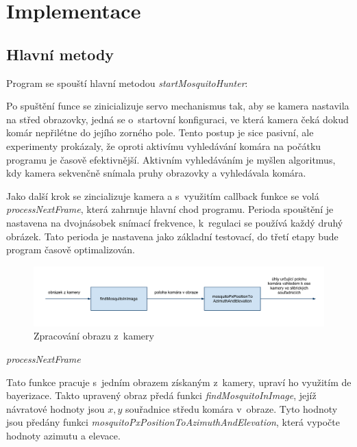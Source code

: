 \documentclass[a4paper,10pt]{article}
\begin{document}
\section{Implementace}

\subsection{Hlavní metody}

		Program se spouští hlavní metodou \textit{startMosquitoHunter}:

		Po spuštění funce se zinicializuje servo mechanismus tak, aby se kamera
		nastavila na střed obrazovky, jedná se o~startovní konfiguraci, ve která kamera
		čeká dokud komár nepřilétne do jejího zorného pole. Tento postup je sice
		pasivní, ale experimenty prokázaly, že oproti aktivímu vyhledávání komára na
		počátku programu je časově efektivnější. Aktivním vyhledáváním je myšlen
		algoritmus, kdy kamera sekvenčně snímala pruhy obrazovky a vyhledávala komára.

		Jako další krok se zincializuje kamera a s~využitím
		callback funkce se volá \textit{processNextFrame}, která zahrnuje hlavní chod
		programu. Perioda spouštění je nastavena na dvojnásobek snímací frekvence, k~regulaci se používá každý druhý obrázek.
		Tato perioda je nastavena jako základní testovací, do třetí etapy bude program časově optimalizován.

		\begin{figure}[!h]
			\centering
			 \includegraphics[width=1\columnwidth]{pics/zpracovani_obrazu_z_kamery}
			 \caption{Zpracování obrazu z~kamery\label{fig:zpracovaniObrazu}}
		\end{figure}


\vspace{0.5cm}
\textit{processNextFrame}

		Tato funkce pracuje s~jedním obrazem získaným z~kamery, upraví ho využitím de
		bayerizace. Takto upravený obraz předá funkci \textit{findMosquitoInImage},
		jejíž návratové hodnoty jsou $x, y$ souřadnice středu komára v~obraze. Tyto
		hodnoty jsou předány funkci \textit{mosquitoPxPositionToAzimuthAndElevation},
		která vypočte hodnoty azimutu a elevace. 
\end{document}

